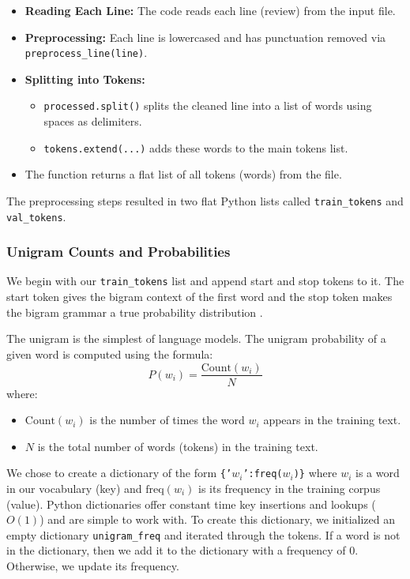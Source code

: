 \documentclass[a4paper]{article}
\begin{document}
\begin{enumerate}
    \begin{itemize}
        \item \textbf{Reading Each Line:} The code reads each line (review) from the input file.
        \item \textbf{Preprocessing:} Each line is lowercased and has punctuation removed via \verb|preprocess_line(line)|.
        \item \textbf{Splitting into Tokens:}
        \begin{itemize}
            \item \verb|processed.split()| splits the cleaned line into a list of words using spaces as delimiters.
            \item \verb|tokens.extend(...)| adds these words to the main tokens list.
        \end{itemize}
        \item The function returns a flat list of all tokens (words) from the file.
    \end{itemize}

\end{enumerate}

The preprocessing steps resulted in two flat Python lists called \texttt{train\_tokens} and \texttt{val\_tokens}.

\subsubsection{Unigram Counts and Probabilities}
We begin with our \texttt{train\_tokens} list and append start and stop tokens to it. The start token gives the bigram context of the first word and the stop token makes the bigram grammar a true probability distribution \cite{jurafsky2021slp}.

The unigram is the simplest of language models. The unigram probability of a given word is computed using the formula:
\[ P(w_i) = \frac{\text{Count}(w_i)}{N} \]
where:
\begin{itemize}
    \item $\text{Count}(w_i)$ is the number of times the word $w_i$ appears in the training text.
    \item $N$ is the total number of words (tokens) in the training text.
\end{itemize}

We chose to create a dictionary of the form \texttt{\{'$w_i$':freq($w_i$)\}} where $w_i$ is a word in our vocabulary (key) and $\text{freq}(w_i)$ is its frequency in the training corpus (value). Python dictionaries offer constant time key insertions and lookups ($O(1)$) and are simple to work with. To create this dictionary, we initialized an empty dictionary \texttt{unigram\_freq} and iterated through the tokens. If a word is not in the dictionary, then we add it to the dictionary with a frequency of 0. Otherwise, we update its frequency.
\end{document}
